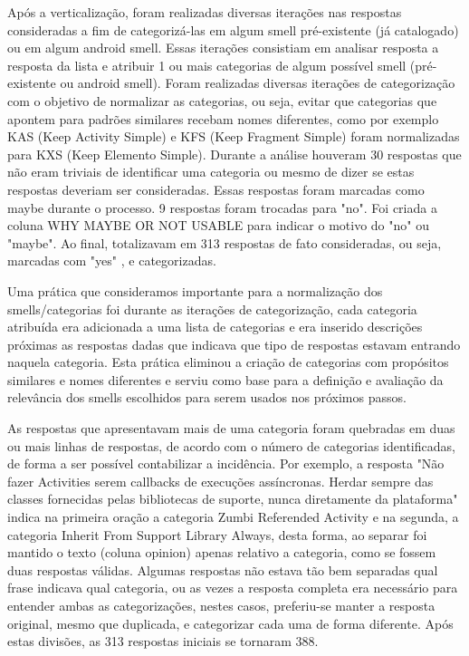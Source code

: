 Ap\'os a verticaliza\c{c}\~ao, foram realizadas diversas itera\c{c}\~oes nas respostas consideradas a fim de categoriz\'a-las em algum smell pr\'e-existente (j\'a catalogado) ou em algum android smell. Essas itera\c{c}\~oes consistiam em analisar resposta a resposta da lista e atribuir 1 ou mais categorias de algum poss\'ivel smell (pr\'e-existente ou android smell). Foram realizadas diversas itera\c{c}\~oes de categoriza\c{c}\~ao com o objetivo de normalizar as categorias, ou seja, evitar que categorias que apontem para padr\~oes similares recebam nomes diferentes, como por exemplo KAS (Keep Activity Simple) e KFS (Keep Fragment Simple) foram normalizadas para KXS (Keep Elemento Simple). Durante a an\'alise houveram 30 respostas que n\~ao eram triviais de identificar uma categoria ou mesmo de dizer se estas respostas deveriam ser consideradas. Essas respostas foram marcadas como maybe durante o processo. 9 respostas foram trocadas para "no". Foi criada a coluna WHY MAYBE OR NOT USABLE para indicar o motivo do "no" ou "maybe". Ao final, totalizavam em 313 respostas de fato consideradas, ou seja, marcadas com "yes" , e categorizadas.

Uma pr\'atica que consideramos importante para a normaliza\c{c}\~ao dos smells/categorias foi durante as itera\c{c}\~oes de categoriza\c{c}\~ao, cada categoria atribu\'ida era adicionada a uma lista de categorias e era inserido descri\c{c}\~oes pr\'oximas as respostas dadas que indicava que tipo de respostas estavam entrando naquela categoria. Esta pr\'atica eliminou a cria\c{c}\~ao de categorias com prop\'ositos similares e nomes diferentes e serviu como base para a defini\c{c}\~ao e avalia\c{c}\~ao da relev\^ancia dos smells escolhidos para serem usados nos pr\'oximos passos.

As respostas que apresentavam mais de uma categoria foram quebradas em duas ou mais linhas de respostas, de acordo com o n\'umero de categorias identificadas, de forma a ser poss\'ivel contabilizar a incid\^encia. Por exemplo, a resposta "N\~ao fazer Activities serem callbacks de execu\c{c}\~oes ass\'incronas. Herdar sempre das classes fornecidas pelas bibliotecas de suporte, nunca diretamente da plataforma" indica na primeira ora\c{c}\~ao a categoria Zumbi Referended Activity e na segunda, a categoria Inherit From Support Library Always, desta forma, ao separar foi mantido o texto (coluna opinion) apenas relativo a categoria, como se fossem duas respostas v\'alidas. Algumas respostas n\~ao estava t\~ao bem separadas qual frase indicava qual categoria, ou as vezes a resposta completa era necess\'ario para entender ambas as categoriza\c{c}\~oes, nestes casos, preferiu-se manter a resposta original, mesmo que duplicada, e categorizar cada uma de forma diferente. Ap\'os estas divis\~oes, as 313 respostas iniciais se tornaram 388.

